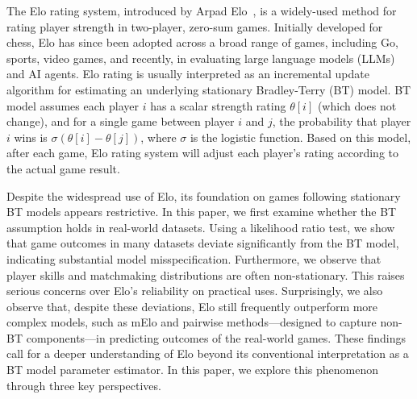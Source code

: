 The Elo rating system, introduced by Arpad Elo~\citep{elo1961new}, is a widely-used method for rating player strength in two-player, zero-sum games. Initially developed for chess, Elo has since been adopted across a broad range of games, including Go, sports, video games, and recently, in evaluating large language models (LLMs) and AI agents. Elo rating is usually interpreted as an incremental update algorithm for estimating an underlying stationary Bradley-Terry (BT) model. BT model assumes each player $i$ has a scalar strength rating $\theta[i]$ (which does not change),  and for a single game between player $i$ and $j$, the probability that player $i$ wins is $\sigma(\theta[i] - \theta[j])$, where $\sigma$ is the logistic function. Based on this model, after each game, Elo rating system will adjust each player's rating according to the actual game result. 


Despite the widespread use of Elo, its foundation on games following stationary BT models appears restrictive. In this paper, we first examine whether the BT assumption holds in real-world datasets. Using a likelihood ratio test, we show that game outcomes in many datasets deviate significantly from the BT model, indicating substantial model misspecification. Furthermore, we observe that player skills and matchmaking distributions are often non-stationary. This raises serious concerns over Elo's reliability on practical uses. Surprisingly, we also observe that, despite these deviations, Elo still frequently outperform more complex models, such as mElo and pairwise methods---designed to capture non-BT components---in predicting outcomes of the real-world games. These findings call for a deeper understanding of Elo beyond its conventional interpretation as a BT model parameter estimator. In this paper, we explore this phenomenon through three key perspectives.




